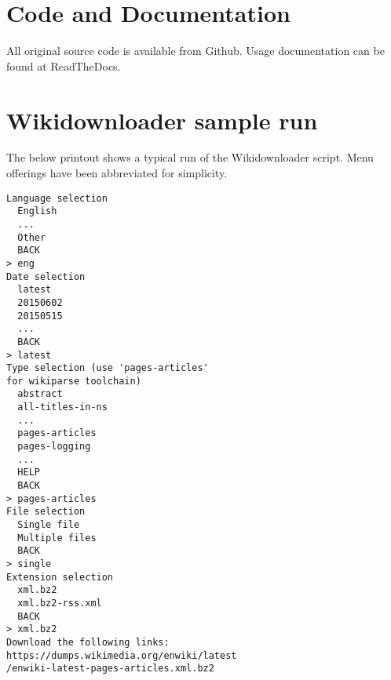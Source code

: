 \section{Code and Documentation}
\label{wpcodeanddocs}

All original source code is available from Github\cite{github}. Usage documentation can be found at ReadTheDocs\cite{readthedocs}.

\section{Wikidownloader sample run}
\label{wdsample}

The below printout shows a typical run of the Wikidownloader script. Menu offerings have been abbreviated for simplicity.

\begin{verbatim}
Language selection
  English
  ...
  Other
  BACK
> eng
Date selection
  latest
  20150602
  20150515
  ...
  BACK
> latest
Type selection (use 'pages-articles' 
for wikiparse toolchain)
  abstract
  all-titles-in-ns
  ...
  pages-articles
  pages-logging
  ...
  HELP
  BACK
> pages-articles
File selection
  Single file
  Multiple files
  BACK
> single
Extension selection
  xml.bz2
  xml.bz2-rss.xml
  BACK
> xml.bz2
Download the following links:
https://dumps.wikimedia.org/enwiki/latest
/enwiki-latest-pages-articles.xml.bz2
\end{verbatim}
